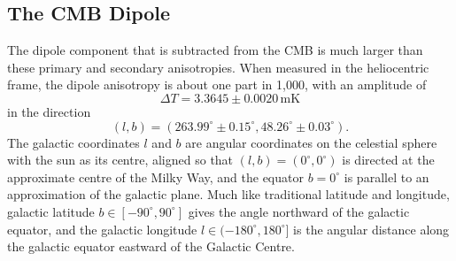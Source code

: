 \documentclass[a4paper,12pt]{report}
\newcommand{\degree}{^\circ}
\begin{document}
\subsection{The CMB Dipole}
The dipole component that is subtracted from the CMB is much larger than these primary and secondary anisotropies. When measured in the heliocentric frame, the dipole anisotropy is about one part in 1,000, with an amplitude of \cite{RN71}
\begin{equation} \label{eqn: CMB dipole magnitude}
  \Delta T = 3.3645 \pm 0.0020\, \text{mK}
\end{equation}
in the direction
\begin{equation} \label{eqn: CMB dipole direction}
  (l,b) = (263.99\degree \pm 0.15\degree, 48.26\degree \pm 0.03\degree).
\end{equation}
The galactic coordinates $l$ and $b$ are angular coordinates on the celestial sphere with the sun as its centre, aligned so that $(l,b)=(0\degree,0\degree)$ is directed at the approximate centre of the Milky Way, and the equator $b=0\degree$ is parallel to an approximation of the galactic plane. Much like traditional latitude and longitude, galactic latitude $b \in [-90\degree, 90\degree]$ gives the angle northward of the galactic equator, and the galactic longitude $l \in (-180\degree, 180\degree]$ is the angular distance along the galactic equator eastward of the Galactic Centre.
\end{document}
